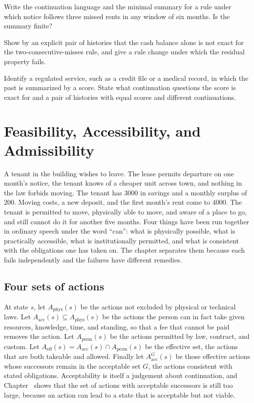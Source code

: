 \begin{exercise}
Write the continuation language and the minimal summary for a rule under which notice follows three missed rents in any window of six months. Is the summary finite?
\end{exercise}
\begin{exercise}
Show by an explicit pair of histories that the cash balance alone is not exact for the two-consecutive-misses rule, and give a rule change under which the residual property fails.
\end{exercise}
\begin{exercise}
Identify a regulated service, such as a credit file or a medical record, in which the past is summarized by a score. State what continuation questions the score is exact for and a pair of histories with equal scores and different continuations.
\end{exercise}

\chapter{Feasibility, Accessibility, and Admissibility}\label{ch:3}

A tenant in the building wishes to leave. The lease permits departure on one month's notice, the tenant knows of a cheaper unit across town, and nothing in the law forbids moving. The tenant has $3000$ in savings and a monthly surplus of $200$. Moving costs, a new deposit, and the first month's rent come to $4000$. The tenant is permitted to move, physically able to move, and aware of a place to go, and still cannot do it for another five months. Four things have been run together in ordinary speech under the word ``can'': what is physically possible, what is practically accessible, what is institutionally permitted, and what is consistent with the obligations one has taken on. The chapter separates them because each fails independently and the failures have different remedies.

\section{Four sets of actions}

At state $s$, let $A_{\mathrm{phys}}(s)$ be the actions not excluded by physical or technical laws. Let $A_{\mathrm{acc}}(s)\subseteq A_{\mathrm{phys}}(s)$ be the actions the person can in fact take given resources, knowledge, time, and standing, so that a fee that cannot be paid removes the action. Let $A_{\mathrm{perm}}(s)$ be the actions permitted by law, contract, and custom. Let $A_{\mathrm{eff}}(s)=A_{\mathrm{acc}}(s)\cap A_{\mathrm{perm}}(s)$ be the effective set, the actions that are both takeable and allowed. Finally let $A_{\mathrm{acc}}^{G}(s)$ be those effective actions whose successors remain in the acceptable set $G$, the actions consistent with stated obligations. Acceptability is itself a judgement about continuation, and Chapter~ shows that the set of actions with acceptable successors is still too large, because an action can lead to a state that is acceptable but not viable.

